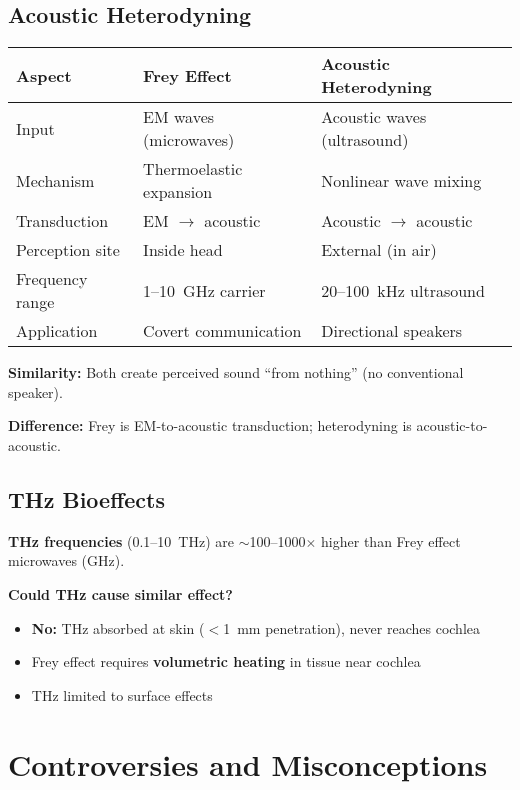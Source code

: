 \subsection{Acoustic Heterodyning}

\begin{center}
\begin{tabular}{@{}lll@{}}
\toprule
\textbf{Aspect} & \textbf{Frey Effect} & \textbf{Acoustic Heterodyning} \\
\midrule
Input & EM waves (microwaves) & Acoustic waves (ultrasound) \\
Mechanism & Thermoelastic expansion & Nonlinear wave mixing \\
Transduction & EM $\rightarrow$ acoustic & Acoustic $\rightarrow$ acoustic \\
Perception site & Inside head & External (in air) \\
Frequency range & 1--10~GHz carrier & 20--100~kHz ultrasound \\
Application & Covert communication & Directional speakers \\
\bottomrule
\end{tabular}
\end{center}

\textbf{Similarity:} Both create perceived sound ``from nothing'' (no conventional speaker).

\textbf{Difference:} Frey is EM-to-acoustic transduction; heterodyning is acoustic-to-acoustic.

\subsection{THz Bioeffects}

\textbf{THz frequencies} (0.1--10~THz) are $\sim$100--1000$\times$ higher than Frey effect microwaves (GHz).

\textbf{Could THz cause similar effect?}
\begin{itemize}
\item[\texttimes] \textbf{No:} THz absorbed at skin ($<$1~mm penetration), never reaches cochlea
\item Frey effect requires \textbf{volumetric heating} in tissue near cochlea
\item THz limited to surface effects
\end{itemize}

\section{Controversies and Misconceptions}

